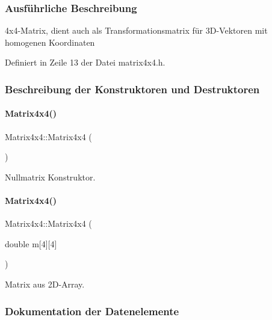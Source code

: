 \subsubsection{Ausführliche Beschreibung}
4x4-\/\+Matrix, dient auch als Transformationsmatrix für 3\+D-\/\+Vektoren mit homogenen Koordinaten 

Definiert in Zeile 13 der Datei matrix4x4.\+h.



\subsubsection{Beschreibung der Konstruktoren und Destruktoren}
\mbox{\label{classMatrix4x4_a714a467ba7f85f88ebe3897b5e3580be}} 
\paragraph{\texorpdfstring{Matrix4x4()}{Matrix4x4()}\hspace{0.1cm}{\footnotesize\ttfamily [1/2]}}
{\footnotesize\ttfamily Matrix4x4\+::\+Matrix4x4 (\begin{DoxyParamCaption}{ }\end{DoxyParamCaption})}



Nullmatrix Konstruktor. 

\mbox{\label{classMatrix4x4_af558f61e15acbf144471b348ae2a5258}} 
\paragraph{\texorpdfstring{Matrix4x4()}{Matrix4x4()}\hspace{0.1cm}{\footnotesize\ttfamily [2/2]}}
{\footnotesize\ttfamily Matrix4x4\+::\+Matrix4x4 (\begin{DoxyParamCaption}\item[{double}]{m\mbox{[}4\mbox{]}\mbox{[}4\mbox{]} }\end{DoxyParamCaption})}



Matrix aus 2\+D-\/\+Array. 



\subsubsection{Dokumentation der Datenelemente}
\mbox{\label{classMatrix4x4_a85ef321b7e2d0b621368e4d775065833}} 

